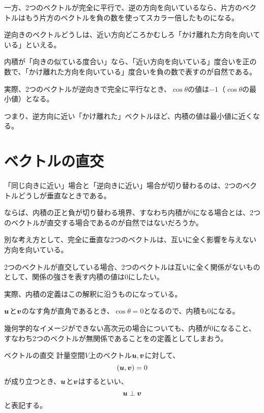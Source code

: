 \documentclass[../../../topic_linear-algebra]{subfiles}
\begin{document}
一方、2つのベクトルが完全に平行で、逆の方向を向いているなら、片方のベクトルはもう片方のベクトルを負の数を使ってスカラー倍したものになる。

\br

逆向きのベクトルどうしは、近い方向どころかむしろ「かけ離れた方向を向いている」といえる。

内積が「向きの似ている度合い」なら、「近い方向を向いている」度合いを正の数で、「かけ離れた方向を向いている」度合いを負の数で表すのが自然である。

\br

実際、2つのベクトルが逆向きで完全に平行なとき、$\cos \theta$の値は$-1$（$\cos\theta$の最小値）となる。

つまり、逆方向に近い「かけ離れた」ベクトルほど、内積の値は最小値に近くなる。

\sectionline
\section{ベクトルの直交}

「同じ向きに近い」場合と「逆向きに近い」場合が切り替わるのは、2つのベクトルどうしが垂直なときである。

ならば、内積の正と負が切り替わる境界、すなわち内積が$0$になる場合とは、2つのベクトルが直交する場合であるのが自然ではないだろうか。

\br

別な考え方として、完全に垂直な2つのベクトルは、互いに全く影響を与えない方向を向いている。

2つのベクトルが直交している場合、2つのベクトルは互いに全く関係がないものとして、関係の強さを表す内積の値は$0$にしたい。

\br

実際、内積の定義はこの解釈に沿うものになっている。

$\vb*{u}$と$\vb*{v}$のなす角が直角であるとき、$\cos \theta = 0$となるので、内積も0になる。

\br

幾何学的なイメージができない高次元の場合についても、内積が0になること、すなわち2つのベクトルが無関係であることをの定義としてしまおう。

\begin{definition}{ベクトルの直交}
  計量空間$V$上のベクトル$\vb*{u},\vb*{v}$に対して、
  \begin{equation*}
    (\vb*{u}, \vb*{v}) = 0
  \end{equation*}
  が成り立つとき、$\vb*{u}$と$\vb*{v}$はするといい、
  \begin{equation*}
    \vb*{u} \perp \vb*{v}
  \end{equation*}
  と表記する。
\end{definition}
\end{document}
